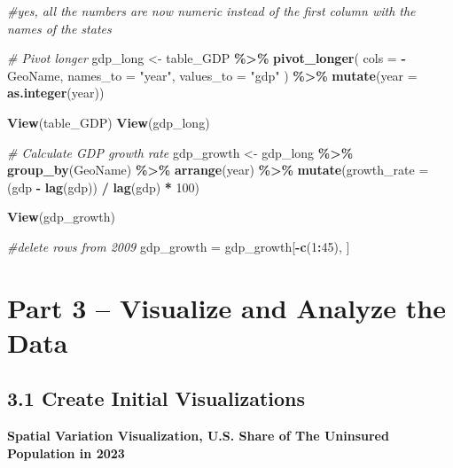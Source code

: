 \documentclass[
]{article}
\newenvironment{Shaded}{\begin{snugshade}}{\end{snugshade}}
\newcommand{\AttributeTok}[1]{\textcolor[rgb]{0.13,0.29,0.53}{#1}}
\newcommand{\CommentTok}[1]{\textcolor[rgb]{0.56,0.35,0.01}{\textit{#1}}}
\newcommand{\DecValTok}[1]{\textcolor[rgb]{0.00,0.00,0.81}{#1}}
\newcommand{\FunctionTok}[1]{\textcolor[rgb]{0.13,0.29,0.53}{\textbf{#1}}}
\newcommand{\NormalTok}[1]{#1}
\newcommand{\OtherTok}[1]{\textcolor[rgb]{0.56,0.35,0.01}{#1}}
\newcommand{\SpecialCharTok}[1]{\textcolor[rgb]{0.81,0.36,0.00}{\textbf{#1}}}
\newcommand{\StringTok}[1]{\textcolor[rgb]{0.31,0.60,0.02}{#1}}
\begin{document}
\begin{Shaded}
\begin{Highlighting}[]
\CommentTok{\#yes, all the numbers are now numeric instead of the first column with the names of the states}


\CommentTok{\# Pivot longer}
\NormalTok{gdp\_long }\OtherTok{\textless{}{-}}\NormalTok{ table\_GDP }\SpecialCharTok{\%\textgreater{}\%}
  \FunctionTok{pivot\_longer}\NormalTok{(}
    \AttributeTok{cols =} \SpecialCharTok{{-}}\NormalTok{GeoName,}
    \AttributeTok{names\_to =} \StringTok{"year"}\NormalTok{,}
    \AttributeTok{values\_to =} \StringTok{"gdp"}
\NormalTok{  ) }\SpecialCharTok{\%\textgreater{}\%}
  \FunctionTok{mutate}\NormalTok{(}\AttributeTok{year =} \FunctionTok{as.integer}\NormalTok{(year))}

\FunctionTok{View}\NormalTok{(table\_GDP)}
\FunctionTok{View}\NormalTok{(gdp\_long)}

\CommentTok{\# Calculate GDP growth rate}
\NormalTok{gdp\_growth }\OtherTok{\textless{}{-}}\NormalTok{ gdp\_long }\SpecialCharTok{\%\textgreater{}\%}
  \FunctionTok{group\_by}\NormalTok{(GeoName) }\SpecialCharTok{\%\textgreater{}\%}
  \FunctionTok{arrange}\NormalTok{(year) }\SpecialCharTok{\%\textgreater{}\%}
  \FunctionTok{mutate}\NormalTok{(}\AttributeTok{growth\_rate =}\NormalTok{ (gdp }\SpecialCharTok{{-}} \FunctionTok{lag}\NormalTok{(gdp)) }\SpecialCharTok{/} \FunctionTok{lag}\NormalTok{(gdp) }\SpecialCharTok{*} \DecValTok{100}\NormalTok{)}

\FunctionTok{View}\NormalTok{(gdp\_growth)}

\CommentTok{\#delete rows from 2009}
\NormalTok{gdp\_growth }\OtherTok{=}\NormalTok{ gdp\_growth[}\SpecialCharTok{{-}}\FunctionTok{c}\NormalTok{(}\DecValTok{1}\SpecialCharTok{:}\DecValTok{45}\NormalTok{), ]}
\end{Highlighting}
\end{Shaded}

\section{Part 3 -- Visualize and Analyze the
Data}\label{part-3-visualize-and-analyze-the-data}

\subsection{3.1 Create Initial
Visualizations}\label{create-initial-visualizations}

\textbf{Spatial Variation Visualization, U.S. Share of The Uninsured
Population in 2023}
\end{document}
